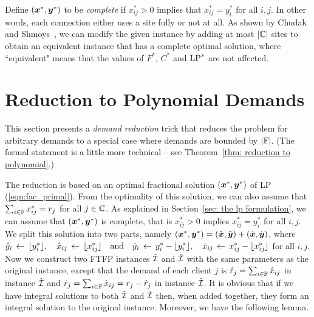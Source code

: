\documentclass{llncs}
\begin{document}

Define $(\boldsymbol{x}^\ast, \boldsymbol{y}^\ast)$ to be \emph{complete} if
$x_{ij}^\ast>0$ implies that $x_{ij}^\ast=y_i^\ast$ for all
$i,j$. In other words, each connection either uses a site
fully or not at all.  As shown by Chudak and
Shmoys~\cite{ChudakS04}, we can modify the given instance by
adding at most $|\mathbb{C}|$ sites to obtain an equivalent
instance that has a complete optimal solution, where
``equivalent" means that the values of $F^\ast$, $C^\ast$ and
$\mbox{\rm LP}^\ast$ are not affected.

\section{Reduction to Polynomial Demands}
\label{sec: polynomial demands}

This section presents a \emph{demand reduction} trick that
reduces the problem for arbitrary demands to a special case
where demands are bounded by $|\mathbb{F}|$.
(The formal statement is a little more technical --
see Theorem~\ref{thm: reduction to polynomial}.) 

The reduction is based on an optimal fractional solution
$(\boldsymbol{x}^\ast,\boldsymbol{y}^\ast)$ of LP (\ref{eqn:fac_primal}). From the
optimality of this solution, we can also assume that
$\sum_{i\in\mathbb{F}} x^\ast_{ij} = r_j$ for all
$j\in\mathbb{C}$.  As explained in Section~\ref{sec: the lp
  formulation}, we can assume that $(\boldsymbol{x}^\ast,\boldsymbol{y}^\ast)$
is complete, that is $x^\ast_{ij} > 0$ implies $x^\ast_{ij}
= y^\ast_i$ for all $i,j$.  We split this solution into two
parts, namely $(\boldsymbol{x}^\ast,\boldsymbol{y}^\ast) = (\hat{\boldsymbol{x}},\hat{\boldsymbol{y}})+
(\dot{\boldsymbol{x}},\dot{\boldsymbol{y}})$, where
%
${\hat y}_i \;{\,\leftarrow\,}\; { \lfloor y_i^\ast \rfloor }, \quad
			{\hat x}_{ij} \;{\,\leftarrow\,}\; { \lfloor x_{ij}^\ast \rfloor } \quad\textrm{and}\quad
{\dot y}_i \;{\,\leftarrow\,}\; y_i^\ast - { \lfloor y_i^\ast \rfloor }, \quad
 	{\dot x}_{ij} \;{\,\leftarrow\,}\; x_{ij}^\ast -  { \lfloor x_{ij}^\ast \rfloor }
$
%
for all $i,j$. Now we construct two
FTFP instances ${\hat{\cal I}}$ and ${\dot{\cal I}}$ with the same
parameters as the original instance, except that the demand of each client $j$ is
${\hat r}_j = \sum_{i\in\mathbb{F}} {\hat x}_{ij}$ in instance ${\hat{\cal I}}$ and
${\dot r}_j = \sum_{i\in\mathbb{F}} {\dot x}_{ij} = r_j - {\hat r}_j$ in instance ${\dot{\cal I}}$. 
It is obvious that if we have integral solutions to both ${\hat{\cal I}}$
and ${\dot{\cal I}}$ then, when added together, they form an integral
solution to the original instance.  Moreover, we have the
following lemma.
\end{document}
